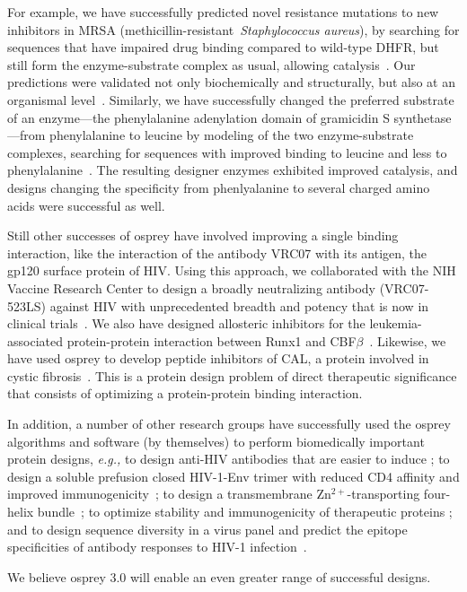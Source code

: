 For example, we have successfully predicted novel resistance mutations to new inhibitors in MRSA (methicillin-resistant~\textit{Staphylococcus aureus}), by searching for sequences that have impaired drug binding compared to wild-type DHFR, but still form the enzyme-substrate complex as usual, allowing catalysis~\cite{DHFR-PNAS,DHFR-PNAS2}.  Our predictions were validated not only biochemically and structurally, but also at an organismal level~\cite{DHFR-PNAS2, mimb_resistance}.  Similarly, we have successfully changed the preferred substrate of an enzyme---the phenylalanine adenylation domain of gramicidin S synthetase---from phenylalanine to leucine by modeling of the two enzyme-substrate complexes, searching for sequences with improved binding to leucine and less to phenylalanine~\cite{GrsA-LeuA}.  The resulting designer enzymes exhibited improved catalysis, and designs changing the specificity from phenlyalanine to several charged amino acids were successful as well.  

Still other successes of {\sc osprey} have involved improving a single binding interaction, like the interaction of the antibody VRC07 with its antigen, the gp120 surface protein of HIV.  Using this approach, we collaborated with the NIH Vaccine Research Center to design a broadly neutralizing antibody (VRC07-523LS) against HIV with unprecedented breadth and potency that is now in clinical trials~\cite{VRC07_enhance,clinical605}.  We also have designed allosteric inhibitors for the leukemia-associated protein-protein interaction between Runx1 and CBF$\beta$~\cite{runx1_cbfb}.  Likewise, we have used {\sc osprey} to develop peptide inhibitors of CAL, a protein involved in cystic fibrosis~\cite{CFTR}.  This is a protein design problem of direct therapeutic significance that consists of optimizing a protein-protein binding interaction.  

In addition, a number of other research groups have successfully used the {\sc osprey} algorithms and software (by themselves) to perform biomedically important protein designs, {\em e.g.,} to design anti-HIV antibodies that are easier to induce \cite{Georgiev:2014aa}; to design a soluble prefusion closed HIV-1-Env trimer with reduced CD4 affinity and improved immunogenicity~\cite{Gwo-yu17}; to design a transmembrane Zn$^{2+}$-transporting four-helix bundle~\cite{Joh14}; to optimize stability and immunogenicity of therapeutic proteins \cite{Parker:2013aa,Salvat:2015aa,Zhao:2015aa}; and to design sequence diversity in a virus panel and predict the epitope specificities of antibody responses to HIV-1 infection~\cite{polyclonal17}.

We believe {\sc osprey} 3.0 will enable an even greater range of successful designs.  
